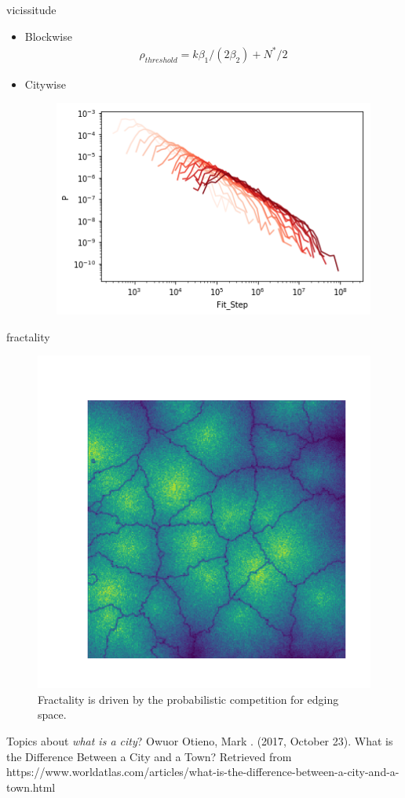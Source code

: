 \documentclass{beamer}
\begin{document}
\begin{frame}{vicissitude}
  \begin{itemize}
    \item Blockwise
  \begin{align}\rho_{threshold} = k\beta_1/(2\beta_2)+N^*/2\end{align}
    \item Citywise
    \begin{figure}
      \includegraphics[width = 0.8\linewidth]{pics/step_number.png}
    \end{figure}
  \end{itemize}
\end{frame}

\begin{frame}{fractality}
  \begin{figure}
    \includegraphics[width = 0.7\linewidth]{pics/fractal_41_256.pdf}
    \caption{Fractality is driven by the probabilistic competition for edging space.}
  \end{figure}
\end{frame}

\begin{frame}{Topics about \emph{what is a city}?}
  Owuor Otieno, Mark . (2017, October 23). What is the Difference Between a City and a Town? Retrieved from https://www.worldatlas.com/articles/what-is-the-difference-between-a-city-and-a-town.html
\end{frame}
\end{document}
